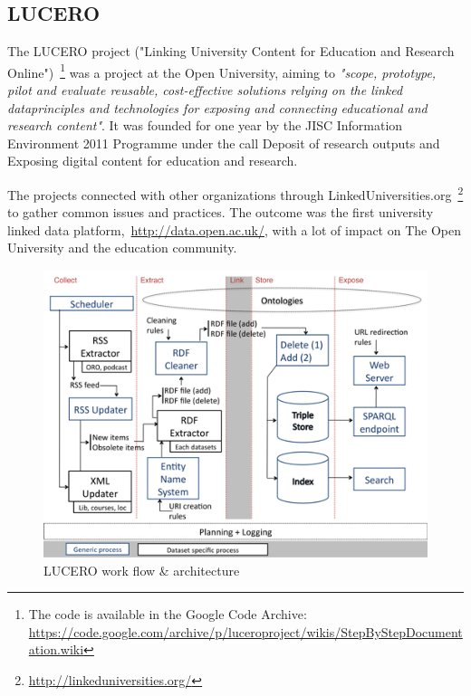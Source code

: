 \subsection{LUCERO}


The LUCERO project ("Linking University Content for Education and Research Online")~\footnote{The code is available in the Google Code Archive: \url{https://code.google.com/archive/p/luceroproject/wikis/StepByStepDocumentation.wiki}} was a project at the Open University, aiming to \emph{"scope, prototype, pilot and evaluate reusable, cost-effective solutions relying on the linked dataprinciples and technologies for exposing and connecting educational and research content"}. It was founded for one year by the JISC Information Environment 2011 Programme under the call Deposit of research outputs and Exposing digital content for education and research.~\cite{lucero:about}

The projects connected with other organizations through LinkedUniversities.org~\footnote{\url{http://linkeduniversities.org/}} to gather common issues and practices. The outcome was the first university linked data platform,~\url{http://data.open.ac.uk/}, with a lot of impact on The Open University and the education community.

\begin{figure}[ht]
	\centering
\includegraphics[width=\textwidth]{img/lucero_architecture.png}
	\caption{LUCERO work flow \& architecture}
	\label{lucero_architecture}
\end{figure}

